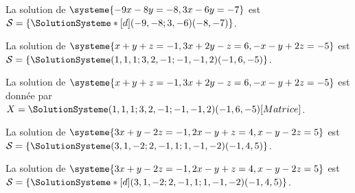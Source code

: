\documentclass[french,a4paper,10pt]{article}
\begin{document}
\begin{demohigh}
La solution de $\systeme{-9x-8y=-8,3x-6y=-7}$ est $\mathcal{S}=%
\left\lbrace \SolutionSysteme*[d](-9,-8;3,-6)(-8,-7) \right\rbrace$.
\end{demohigh}

\begin{demohigh}
La solution de $\systeme{x+y+z=-1,3x+2y-z=6,-x-y+2z=-5}$ est $\mathcal{S}=%
\left\lbrace \SolutionSysteme(1,1,1;3,2,-1;-1,-1,2)(-1,6,-5) \right\rbrace$.
\end{demohigh}

\begin{demohigh}
La solution de $\systeme{x+y+z=-1,3x+2y-z=6,-x-y+2z=-5}$ est donnée par $X=%
\SolutionSysteme(1,1,1;3,2,-1;-1,-1,2)(-1,6,-5)[Matrice]$.
\end{demohigh}

\begin{demohigh}
La solution de $\systeme{3x+y-2z=-1,2x-y+z=4,x-y-2z=5}$ est $\mathcal{S}=%
\left\lbrace \SolutionSysteme(3,1,-2;2,-1,1;1,-1,-2)(-1,4,5) \right\rbrace$.
\end{demohigh}

\begin{demohigh}
La solution de $\systeme{3x+y-2z=-1,2x-y+z=4,x-y-2z=5}$ est $\mathcal{S}=%
\left\lbrace \SolutionSysteme*[d](3,1,-2;2,-1,1;1,-1,-2)(-1,4,5) \right\rbrace$.
\end{demohigh}
\end{document}
